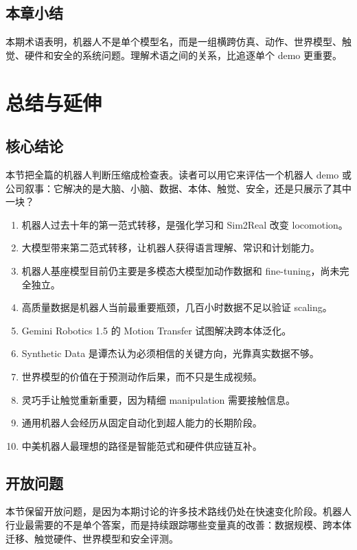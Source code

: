 \documentclass[a4paper]{article}
\begin{document}
\subsection{本章小结}

本期术语表明，机器人不是单个模型名，而是一组横跨仿真、动作、世界模型、触觉、硬件和安全的系统问题。理解术语之间的关系，比追逐单个 demo 更重要。

\section{总结与延伸}

\subsection{核心结论}

本节把全篇的机器人判断压缩成检查表。读者可以用它来评估一个机器人 demo 或公司叙事：它解决的是大脑、小脑、数据、本体、触觉、安全，还是只展示了其中一块？

\begin{enumerate}
\item 机器人过去十年的第一范式转移，是强化学习和 Sim2Real 改变 locomotion。
\item 大模型带来第二范式转移，让机器人获得语言理解、常识和计划能力。
\item 机器人基座模型目前仍主要是多模态大模型加动作数据和 fine-tuning，尚未完全独立。
\item 高质量数据是机器人当前最重要瓶颈，几百小时数据不足以验证 scaling。
\item Gemini Robotics 1.5 的 Motion Transfer 试图解决跨本体泛化。
\item Synthetic Data 是谭杰认为必须相信的关键方向，光靠真实数据不够。
\item 世界模型的价值在于预测动作后果，而不只是生成视频。
\item 灵巧手让触觉重新重要，因为精细 manipulation 需要接触信息。
\item 通用机器人会经历从固定自动化到超人能力的长期阶段。
\item 中美机器人最理想的路径是智能范式和硬件供应链互补。
\end{enumerate}

\subsection{开放问题}

本节保留开放问题，是因为本期讨论的许多技术路线仍处在快速变化阶段。机器人行业最需要的不是单个答案，而是持续跟踪哪些变量真的改善：数据规模、跨本体迁移、触觉硬件、世界模型和安全评测。
\end{document}
